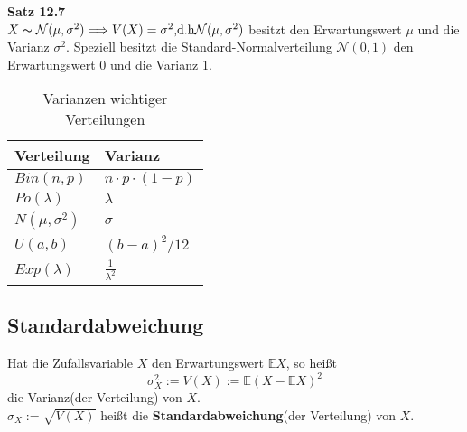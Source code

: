 \textbf{Satz 12.7}\\
$X\thicksim \mathcal{N}(\mu,\sigma^2)\Longrightarrow V(X)=\sigma^2\textrm{,d.h}\mathcal{N}(\mu,\sigma^2)$ besitzt den Erwartungswert $\mu$ und die Varianz $\sigma^2$. Speziell besitzt die Standard-Normalverteilung $\mathcal{N}(0,1)$ den Erwartungswert 0 und die Varianz 1. 

\begin{table}[h]
    \begin{tabular}{|l|l|}
    \hline
    Verteilung     & Varianz               \\ \hline
    $Bin(n,p)$     & $n\cdot p\cdot (1-p)$ \\
    $Po(\lambda)$  & $\lambda$             \\ \hline
    $N(\mu,\sigma^2)$   & $\sigma$                 \\
    $U(a,b)$       & $(b-a)^2/12$          \\
    $Exp(\lambda)$ & $\frac{1}{\lambda^2}$ \\ \hline
    \end{tabular}
    \caption{Varianzen wichtiger Verteilungen}
    \label{Varianzen wichtiger Verteilungen}
\end{table}


\subsection{Standardabweichung}
Hat die Zufallsvariable $X$ den Erwartungswert $\mathbb{E}X$, so heißt 
\[\sigma^2_X:= V(X) := \mathbb{E}(X-\mathbb{E}X)^2\]
die Varianz(der Verteilung) von $X$.\\
$\sigma_X:=\sqrt{V(X)} $ heißt die \textbf{Standardabweichung}(der Verteilung) von $X$.